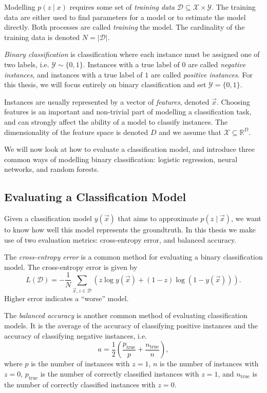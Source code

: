     Modelling $p(z \mid x)$ requires some set of \emph{training data} $\mathcal
    D \subseteq \mathcal X \times \mathcal Y$. The training data are either used
    to find parameters for a model or to estimate the model directly. Both
    processes are called \emph{training} the model. The cardinality of the
    training data is denoted $N = |\mathcal D|$.

    \emph{Binary classification} is classification where each instance must be
    assigned one of two labels, i.e. $\mathcal Y \sim \{0, 1\}$. Instances with
    a true label of $0$ are called \emph{negative instances}, and instances with
    a true label of $1$ are called \emph{positive instances}. For this thesis,
    we will focus entirely on binary classification and set $\mathcal Y = \{0,
    1\}$.

    Instances are usually represented by a vector of \emph{features}, denoted
    $\vec x$. Choosing features is an important and non-trivial part of
    modelling a classification task, and can strongly affect the ability of a
    model to classify instances. The dimensionality of the feature space is
    denoted $D$ and we assume that $\mathcal X \subseteq \mathbb{R}^D$.

    We will now look at how to evaluate a classification model, and introduce
    three common ways of modelling binary classification: logistic regression,
    neural networks, and random forests.

    \subsection{Evaluating a Classification Model}
    \label{sec:evaluating-classification-model}

        Given a classification model $y(\vec x)$ that aims to approximate $p(z
        \mid \vec x)$, we want to know how well this model represents the
        groundtruth. In this thesis we make use of two evaluation metrics:
        cross-entropy error, and balanced accuracy.

        The \emph{cross-entropy error} \citep{bishop06} is a common method for
        evaluating a binary classification model. The cross-entropy error is
        given by
        \[
            L(\mathcal D) = -\frac{1}{N} \sum_{\vec x, z \in \mathcal D} \left(
                z \log y(\vec x) + (1 - z) \log (1 - y(\vec x))
            \right).
        \]
        Higher error indicates a ``worse'' model.

        The \emph{balanced accuracy} is another common method of evaluating
        classification models. It is the average of the accuracy of classifying
        positive instances and the accuracy of classifying negative instances,
        i.e.
        \[
            a = \frac{1}{2} \left(\frac{p_{\text{true}}}{p} + \frac{n_{\text{true}}}{n}\right),
        \]
        where $p$ is the number of instances with $z = 1$, $n$ is the number of
        instances with $z = 0$, $p_{\text{true}}$ is the number of correctly
        classified instances with $z = 1$, and $n_{\text{true}}$ is the number
        of correctly classified instances with $z = 0$.


